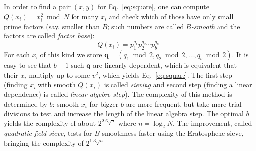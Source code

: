 \documentclass[a4paper]{article}
\begin{document}
In order to find a pair $(x,y)$ for Eq.~\eqref{eq:square}, one can compute $Q(x_i) = x_i^2\bmod{N}$ for many $x_i$ and check which of those have only small prime factors (say, smaller than $B$; such numbers are called \emph{$B$-smooth} and the factors are called \emph{factor base}): 
$$
Q(x_i) = p_1^{q_1}p_2^{q_2}\cdots p_b^{q_b}
$$For each $x_i$ of this kind we store $\mathbf{q}=(q_1 \bmod 2,q_2 \bmod 2,\ldots,q_b \bmod 2)$. It is easy to see that $b+1$ such $\mathbf{q}$ are linearly dependent, which is equivalent that their $x_i$ multiply up to some $v^2$, which yields Eq.~\eqref{eq:square}. The first step (finding $x_i$ with smooth $Q(x_i)$ is called \emph{sieving} and second step (finding a linear dependence) is called \emph{linear algebra step}).
The complexity of this method is determined by $b$: smooth $x_i$ for bigger $b$ are more frequent, but take more trial divisions to test and increase the length of the linear algebra step. The optimal $b$ yields the complexity of about $2^{2.6\sqrt{n}}$ where $n=\log_2 N$. The improvement, called \emph{quadratic field sieve}, tests for $B$-smoothness faster using the Eratosphene sieve, bringing the complexity of $2^{1.3\sqrt{n}}$
\end{document}
